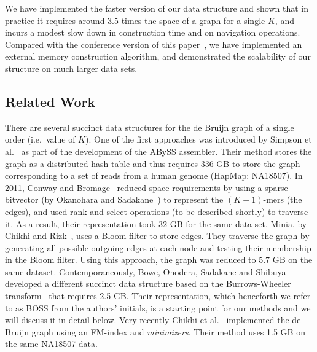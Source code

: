 We have implemented the faster version of our data structure and shown that in practice
it requires around $3.5$ times the space of a graph for a single $K$, and incurs a
modest slow down in construction time and on navigation operations. Compared
with the conference version of this paper~\cite{varorder-dcc}, we have implemented an
external memory construction algorithm, and demonstrated the scalability of our
structure on much larger data sets.


\subsection{Related Work} There are several succinct data structures for the de
Bruijn graph of a single order (i.e.~value of $K$).  One of the first approaches
was introduced by Simpson et al.~\cite{Simpson:2009} as part of the development
of the ABySS assembler.  Their method stores the graph as a distributed hash
table and thus requires 336 GB to store the graph corresponding to a set of
reads from a human genome (HapMap: NA18507).  In 2011, Conway and
Bromage~\cite{conway} reduced space requirements by using a sparse bitvector (by
Okanohara and Sadakane~\cite{bitvector}) to represent the $(K + 1)$-mers (the
edges), and used rank and select operations (to be described shortly) to
traverse it. As a result, their representation took 32 GB for the same data set.
Minia, by Chikhi and Rizk~\cite{wabi}, uses a Bloom filter to store edges.
They traverse the graph by generating all possible outgoing edges at each node
and testing their membership in the Bloom filter. Using this approach, the graph
was reduced to 5.7 GB on the same dataset.  Contemporaneously, Bowe, Onodera,
Sadakane and Shibuya~\cite{BOSS12} developed a different succinct data structure
based on the Burrows-Wheeler transform~\cite{BW94} that requires 2.5 GB.
Their representation, which henceforth we refer to as BOSS from the authors'
initials, is a starting point for our methods and we will discuss it in detail
below.  Very recently Chikhi {et al.}~\cite{paul} implemented the de Bruijn
graph using an FM-index and {\em minimizers}.  Their method uses 1.5 GB on the
same NA18507 data.  

